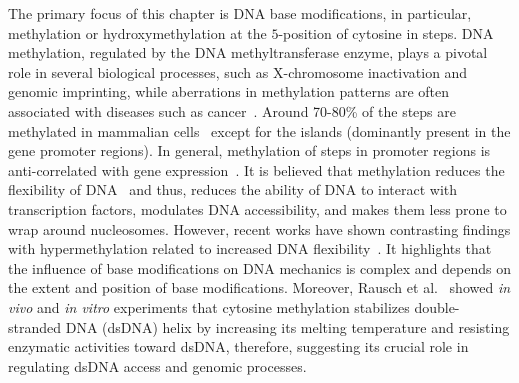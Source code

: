 
The primary focus of this chapter is DNA base modifications, in particular, methylation or hydroxymethylation at the $5$-position of cytosine in \cpg steps.
DNA methylation, regulated by the DNA methyltransferase enzyme, plays a pivotal role in several biological processes, such as X-chromosome inactivation and genomic imprinting, while aberrations in methylation patterns are often associated with diseases such as cancer~\cite{portela2010epigenetic,kulis2010dna}.
Around 70-80\% of the \cpg steps are methylated in mammalian cells~\cite{jabbari2004cytosine} except for the \cpg islands (dominantly present in the gene promoter regions).
In general, methylation of \cpg steps in promoter regions is anti-correlated with gene expression~\cite{cedar2009linking,pennings2005dna}. 
It is believed that \cpg methylation reduces the flexibility of DNA~\cite{cortini2016physics,perez2012impact,portella2013understanding} and thus, reduces the ability of DNA to interact with transcription factors, modulates DNA accessibility, and makes them less prone to wrap around nucleosomes.
However, recent works have shown contrasting findings with hypermethylation related to increased DNA flexibility~\cite{pongor2017optical,shon2019submicrometer,marin2019dna,liebl2019methyl}.
It highlights that the influence of base modifications on DNA mechanics is complex and depends on the extent and position of base modifications.
Moreover, Rausch et al.~\cite{rausch2021cytosine} showed \textit{in vivo} and \textit{in vitro} experiments that cytosine methylation stabilizes double-stranded DNA (dsDNA) helix by increasing its melting temperature and resisting enzymatic activities toward dsDNA, therefore, suggesting its crucial role in regulating dsDNA access and genomic processes.

